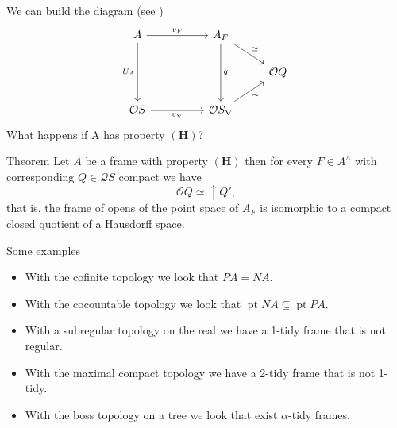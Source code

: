 \documentclass[compress,12pt]{beamer}
\DeclareMathOperator{\pt}{pt}
\begin{document}
\begin{frame}[fragile]
We can build the diagram (see \cite{H.S.V})
\[\begin{tikzcd}
	A && {A_F} \\
	&&& \mathcal{O}Q \\
	{\mathcal{O}S} && {\mathcal{O}S_\nabla}
	\arrow["{v_F}", from=1-1, to=1-3]
	\arrow["{U_A}"', from=1-1, to=3-1]
	\arrow["{\simeq }", from=1-3, to=2-4]
	\arrow["g", from=1-3, to=3-3]
	\arrow["{v_\nabla}"', from=3-1, to=3-3]
	\arrow["{\simeq }"', from=3-3, to=2-4]
\end{tikzcd}\]
What happens if A has property $\mathbf{(H)}$?

\end{frame}

\begin{frame}
\begin{block}{Theorem}
Let $A$ be a frame with property $\mathbf{(H)}$ then for every $F\in A^\wedge$ with corresponding $Q\in \mathcal{Q}S$ compact we have
\[
\mathcal{O}Q\simeq \uparrow{Q'},
\]
that is, the frame of opens of the point space of $A_F$ is isomorphic to a compact
closed quotient of a Hausdorff space.
\end{block}
\end{frame}

\begin{frame}{Some examples}
\begin{itemize}
\item With the cofinite topology we look that $PA= NA$.
\item With the cocountable topology we look that $\pt NA\subseteq \pt PA$.
\item With a subregular topology on the real we have a 1-tidy frame that is not regular. 
\item With the maximal compact topology we have a 2-tidy frame that is not 1-tidy.
\item With the boss topology on a tree we look that exist $\alpha$-tidy frames.
\end{itemize}
\end{frame}


\End
\end{document}
